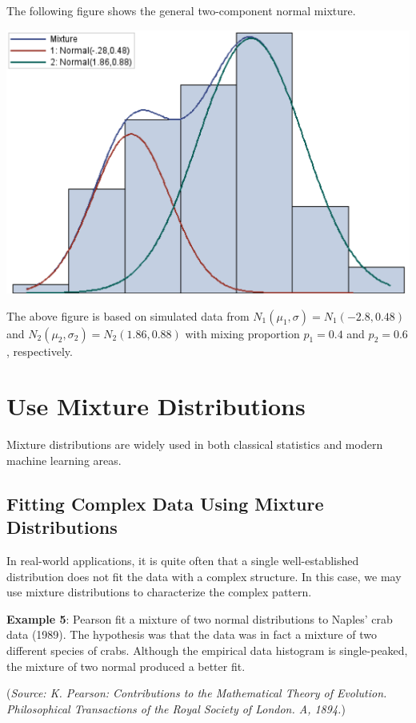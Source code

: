 \documentclass[
]{book}
\begin{document}
The following figure shows the general two-component normal mixture.

\hfill\break

\begin{center}\includegraphics[width=0.5\linewidth]{topic04/twoComponentGaussianMixture} \end{center}

The above figure is based on simulated data from \(N_1(\mu_1, \sigma) = N_1(-2.8, 0.48)\) and \(N_2(\mu_2, \sigma_2) = N_2(1.86, 0.88)\) with mixing proportion \(p_1 = 0.4\) and \(p_2 = 0.6\), respectively.

\hfill\break

\hypertarget{use-mixture-distributions}{%
\section{Use Mixture Distributions}\label{use-mixture-distributions}}

Mixture distributions are widely used in both classical statistics and modern machine learning areas.

\hypertarget{fitting-complex-data-using-mixture-distributions}{%
\subsection{Fitting Complex Data Using Mixture Distributions}\label{fitting-complex-data-using-mixture-distributions}}

In real-world applications, it is quite often that a single well-established distribution does not fit the data with a complex structure. In this case, we may use mixture distributions to characterize the complex pattern.

\textbf{Example 5}: Pearson fit a mixture of two normal distributions to Naples' crab data (1989). The hypothesis was that the data was in fact a mixture of two different species of crabs. Although the empirical data histogram is single-peaked, the mixture of two normal produced a better fit.

(\emph{Source: K. Pearson: Contributions to the Mathematical Theory of Evolution. Philosophical Transactions of the Royal Society of London. A, 1894.})
\end{document}
